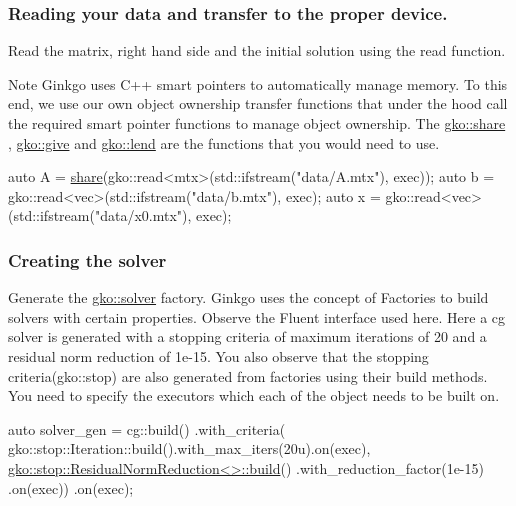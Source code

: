 \label{_Readingyourdataandtransfertotheproperdevice}%
 \subsubsection*{Reading your data and transfer to the proper device.}

Read the matrix, right hand side and the initial solution using the read function. \begin{DoxyNote}{Note}
Ginkgo uses C++ smart pointers to automatically manage memory. To this end, we use our own object ownership transfer functions that under the hood call the required smart pointer functions to manage object ownership. The \hyperlink{namespacegko_a3ce296f73db0ff398bdea6009a3a5c58}{gko\+::share} , \hyperlink{namespacegko_acbd3fd6d07e498892881e8e2ab0b4167}{gko\+::give} and \hyperlink{namespacegko_aa8cb4876b72e5e1036ea9575443c439b}{gko\+::lend} are the functions that you would need to use.
\end{DoxyNote}

\begin{DoxyCode}
\textcolor{keyword}{auto} A = \hyperlink{namespacegko_a3ce296f73db0ff398bdea6009a3a5c58}{share}(gko::read<mtx>(std::ifstream(\textcolor{stringliteral}{"data/A.mtx"}), exec));
\textcolor{keyword}{auto} b = gko::read<vec>(std::ifstream(\textcolor{stringliteral}{"data/b.mtx"}), exec);
\textcolor{keyword}{auto} x = gko::read<vec>(std::ifstream(\textcolor{stringliteral}{"data/x0.mtx"}), exec);
\end{DoxyCode}


\label{_Creatingthesolver}%
 \subsubsection*{Creating the solver}

Generate the \hyperlink{namespacegko_1_1solver}{gko\+::solver} factory. Ginkgo uses the concept of Factories to build solvers with certain properties. Observe the Fluent interface used here. Here a cg solver is generated with a stopping criteria of maximum iterations of 20 and a residual norm reduction of 1e-\/15. You also observe that the stopping criteria(gko\+::stop) are also generated from factories using their build methods. You need to specify the executors which each of the object needs to be built on.


\begin{DoxyCode}
\textcolor{keyword}{auto} solver\_gen =
    cg::build()
        .with\_criteria(
            gko::stop::Iteration::build().with\_max\_iters(20u).on(exec),
            \hyperlink{classgko_1_1stop_1_1ResidualNormReduction}{gko::stop::ResidualNormReduction<>::build}()
                .with\_reduction\_factor(1e-15)
                .on(exec))
        .on(exec);
\end{DoxyCode}


